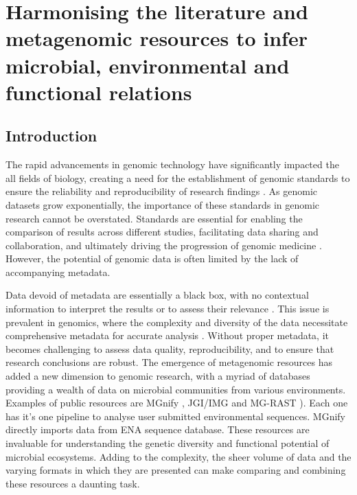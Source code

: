 % 
% 


\chapter{Harmonising the literature and metagenomic resources to infer microbial, environmental and functional relations}
\label{cha:prego}


\section{Introduction}
\label{sec:prego-intro}

The rapid advancements in genomic technology have significantly impacted the
all fields of biology, creating a need for the establishment
of genomic standards to ensure the reliability and reproducibility of research
findings \parencite{Field2011}. As genomic datasets grow exponentially, the importance of these standards
in genomic research cannot be overstated. Standards are essential for enabling
the comparison of results across different studies, facilitating data sharing and
collaboration, and ultimately driving the progression of genomic medicine \parencite{vangay2021microbiome}.
However, the potential of genomic data is often limited by the lack of accompanying
metadata.

Data devoid of metadata are essentially a black box, with no contextual
information to interpret the results or to assess their relevance \parencite{michener_nongeospatial_1997}.
This issue is
prevalent in genomics, where the complexity and diversity of the data
necessitate comprehensive metadata for accurate analysis \parencite{vangay2021microbiome}.
Without proper metadata, it becomes challenging to assess data quality,
reproducibility, and to ensure that research conclusions are robust.
The emergence of metagenomic resources has added a new dimension to genomic
research, with a myriad of databases providing a wealth of data on microbial
communities from various environments.
Examples of public resources are MGnify \parencite{mitchell2020mgnify},
JGI/IMG \parencite{chen2021img} and MG-RAST \parencite{wilke2015restful}). Each one 
has it's one pipeline to analyse user submitted environmental sequences. MGnify
directly imports data from ENA sequence database.
These resources are invaluable for
understanding the genetic diversity and functional potential of microbial
ecosystems. Adding to the complexity, the sheer volume of data and the varying formats in which
they are presented can make comparing and combining these resources a daunting task. 

